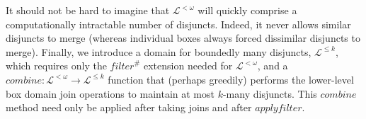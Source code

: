 It should not be hard to imagine that $\mathcal{L}^{<\omega}$ will quickly comprise
a computationally intractable number of disjuncts.
Indeed, it never allows similar disjuncts to merge
(whereas individual boxes always forced dissimilar disjuncts to merge).
Finally, we introduce a domain for boundedly many disjuncts, $\mathcal{L}^{\leq k}$,
which requires only \rone the $\mathit{filter}^\#$ extension needed for $\mathcal{L}^{<\omega}$,
and \rtwo a $\mathit{combine} : \mathcal{L}^{<\omega} \rightarrow \mathcal{L}^{\leq k}$ function
that (perhaps greedily) performs the lower-level box domain join operations
to maintain at most $k$-many disjuncts.
This $\mathit{combine}$ method need only be applied after taking joins
and after $\mathit{applyfilter}$.
